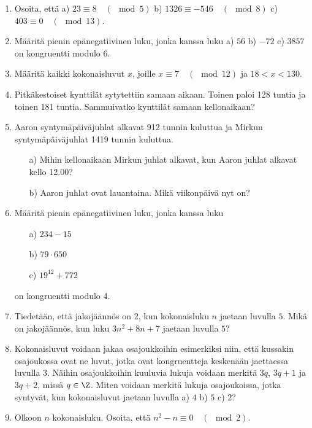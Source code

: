 \begin{enumerate}

\item
Osoita, että a) $23 \equiv 8 \quad (\mod 5)$ b) $1326 \equiv -546\quad (\mod 8)$ c) $403 \equiv 0 \quad (\mod 13)$.

\item
Määritä pienin epänegatiivinen luku, jonka kanssa luku a) $56$ b) $-72$ c) $3857$ on kongruentti modulo $6$.

\item
Määritä kaikki kokonaisluvut $x$, joille $x \equiv 7 \quad (\mod 12)$ ja $18 < x < 130$.

\item
Pitkäkestoiset kynttilät sytytettiin samaan aikaan. Toinen paloi 128 tuntia ja toinen 181 tuntia. Sammuivatko kynttilät samaan kellonaikaan?

\item Aaron syntymäpäiväjuhlat alkavat 912 tunnin kuluttua ja Mirkun syntymäpäiväjuhlat 1419 tunnin kuluttua.
\begin{itemize}
\item[a)] Mihin kellonaikaan Mirkun juhlat alkavat, kun Aaron juhlat alkavat kello 12.00?
\item[b)] Aaron juhlat ovat lauantaina. Mikä viikonpäivä nyt on?
\end{itemize}

\item Määritä pienin epänegatiivinen luku, jonka kanssa luku
\begin{itemize}
\item[a)] $234 - 15$
\item[b)] $79 \cdot 650$
\item[c)] $19^{12} + 772$
\end{itemize}
on kongruentti modulo 4.

\item
Tiedetään, että jakojäännös on $2$, kun kokonaisluku $n$ jaetaan luvulla $5$. Mikä on jakojäännös, kun luku $3n^2 + 8n + 7$ jaetaan luvulla $5$?

\item Kokonaisluvut voidaan jakaa osajoukkoihin esimerkiksi niin, että kussakin osajoukossa ovat ne luvut, jotka ovat kongruentteja keskenään jaettaessa luvulla 3. Näihin osajoukkoihin kuuluvia lukuja voidaan merkitä $3q$, $3q + 1$ ja $3q + 2$, missä $q \in \Z$. Miten voidaan merkitä lukuja osajoukoissa, jotka syntyvät, kun kokonaisluvut jaetaan luvulla a) $4$ b) $5$ c) $2$?

\item Olkoon $n$ kokonaisluku. Osoita, että $n^2 - n \equiv 0\quad (\mod 2)$.


\end{enumerate}
